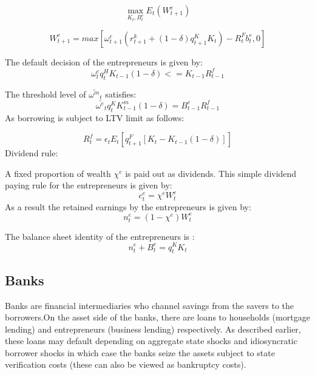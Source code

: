 \documentclass[12pt]{article}
\numberwithin{equation}{section}
\begin{document}
\begin{appendix}
\begin{equation}
\max_{K_t,B^e_t}E_t(W^e_{t+1})
\end{equation}	


\begin{equation}
W^e_{t+1}=max[\omega^e_{t+1}(r^k_{t+1}+(1-\delta)q^K_{t+1}K_{t})-R^F_{t}b^e_{t},0]
\end{equation}


The default decision of the entrepreneurs is given by:
\begin{equation}
{{\omega^e_{t} }}q^H_{t} K_{t-1}(1-\delta) <= K_{t-1}R^f_{t-1}
\end{equation}

The threshold level of $\bar{\omega^m}_t$ satisfies:
\begin{equation}
\bar{\omega^e}_t q^K_{t} K^m_{t-1}(1-\delta) = B^e_{t-1}R^f_{t-1}
\end{equation}
As borrowing is subject to LTV limit as follows:

\begin{equation}
[B^e_t-B^e_{t-1}(1-rp)]R^f_{t} =\epsilon_{t} E_t[q^F_{t+1} [K_t-K_{t-1}(1-\delta)]]
\end{equation}
Dividend rule:

A fixed proportion of wealth $\chi^e$ is paid out as dividends. This simple dividend paying rule for the entrepreneurs is given by:
\begin{equation}
c^e_t=\chi^e W^e_t
\end{equation}
As a result the retained earnings by the entrepreneurs is given by:
\begin{equation}
n^e_t=(1-\chi^e) W^e_t
\end{equation}

The balance sheet identity of the entrepreneurs is :
\begin{equation}
n^e_t+B^e_t=q^K_t K_t
\end{equation}

\subsection*{Banks}

Banks are financial intermediaries who channel savings from the savers to the borrowers.On the asset side of the banks, there are loans to households (mortgage lending) and entrepreneurs (business lending) respectively. As described earlier, these loans may default depending on aggregate state shocks and idiosyncratic borrower shocks in which case the banks seize the assets subject to state verification costs (these can also be viewed as bankruptcy costs).


\end{appendix}
\end{document}
